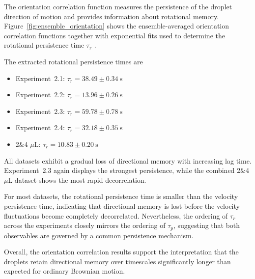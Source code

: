 The orientation correlation function measures the persistence of the droplet direction of motion and provides information about rotational memory. Figure~\ref{fig:ensemble_orientation} shows the ensemble-averaged orientation correlation functions together with exponential fits used to determine the rotational persistence time $\tau_r$ \cite{balakrishnan2021}.


The extracted rotational persistence times are

\begin{itemize}
\item Experiment~2.1: $\tau_r = 38.49 \pm 0.34~\mathrm{s}$
\item Experiment~2.2: $\tau_r = 13.96 \pm 0.26~\mathrm{s}$
\item Experiment~2.3: $\tau_r = 59.78 \pm 0.78~\mathrm{s}$
\item Experiment~2.4: $\tau_r = 32.18 \pm 0.35~\mathrm{s}$
\item 2\&4 $\mu$L: $\tau_r = 10.83 \pm 0.20~\mathrm{s}$
\end{itemize}

All datasets exhibit a gradual loss of directional memory with increasing lag time. Experiment~2.3 again displays the strongest persistence, while the combined 2\&4 $\mu$L dataset shows the most rapid decorrelation.

For most datasets, the rotational persistence time is smaller than the velocity persistence time, indicating that directional memory is lost before the velocity fluctuations become completely decorrelated. Nevertheless, the ordering of $\tau_r$ across the experiments closely mirrors the ordering of $\tau_p$, suggesting that both observables are governed by a common persistence mechanism.

Overall, the orientation correlation results support the interpretation that the droplets retain directional memory over timescales significantly longer than expected for ordinary Brownian motion\cite{balakrishnan2021}.

